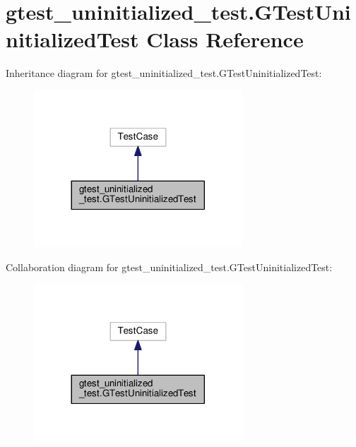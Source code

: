 \hypertarget{classgtest__uninitialized__test_1_1GTestUninitializedTest}{}\section{gtest\+\_\+uninitialized\+\_\+test.\+G\+Test\+Uninitialized\+Test Class Reference}
\label{classgtest__uninitialized__test_1_1GTestUninitializedTest}


Inheritance diagram for gtest\+\_\+uninitialized\+\_\+test.\+G\+Test\+Uninitialized\+Test\+:\nopagebreak
\begin{figure}[H]
\begin{center}
\leavevmode
\includegraphics[width=221pt]{classgtest__uninitialized__test_1_1GTestUninitializedTest__inherit__graph}
\end{center}
\end{figure}


Collaboration diagram for gtest\+\_\+uninitialized\+\_\+test.\+G\+Test\+Uninitialized\+Test\+:\nopagebreak
\begin{figure}[H]
\begin{center}
\leavevmode
\includegraphics[width=221pt]{classgtest__uninitialized__test_1_1GTestUninitializedTest__coll__graph}
\end{center}
\end{figure}
